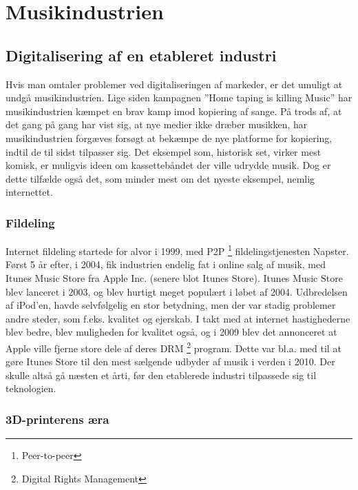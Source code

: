 \chapter{Musikindustrien}

\section{Digitalisering af en etableret industri}

Hvis man omtaler problemer ved digitaliseringen af markeder, er det umuligt at undgå musikindustrien. Lige siden kampagnen ”Home taping is killing Music” \autocite{andrew_dickson_home_2005} har musikindustrien kæmpet en brav kamp imod kopiering af sange. På trods af, at det gang på gang har vist sig, at nye medier ikke dræber musikken, har musikindustrien forgæves forsøgt at bekæmpe de nye platforme for kopiering, indtil de til sidst tilpasser sig. Det eksempel som, historisk set, virker mest komisk, er muligvis ideen om kassettebåndet der ville udrydde musik. Dog er dette tilfælde også det, som minder mest om det nyeste eksempel, nemlig internettet.

\subsection{Fildeling}

Internet fildeling startede for alvor i 1999, med P2P \footnote{Peer-to-peer} fildelingstjenesten Napster. Først 5 år efter, i 2004, fik industrien endelig fat i online salg af musik, med Itunes Music Store fra Apple Inc. (senere blot Itunes Store). Itunes Music Store blev lanceret i 2003, og blev hurtigt meget populært i løbet af 2004. Udbredelsen af iPod’en, havde selvfølgelig en stor betydning, men der var stadig problemer andre steder, som f.eks. kvalitet og ejerskab. I takt med at internet hastighederne blev bedre, blev muligheden for kvalitet også, og i 2009 blev det annonceret at Apple ville fjerne store dele af deres DRM \footnote{Digital Rights Management} program. Dette var bl.a. med til at gøre Itunes Store til den mest sælgende udbyder af musik i verden i 2010. \autocite{apple_itunes_2010} Der skulle altså gå næsten et årti, før den etablerede industri tilpassede sig til teknologien. 

\subsection{3D-printerens æra}

